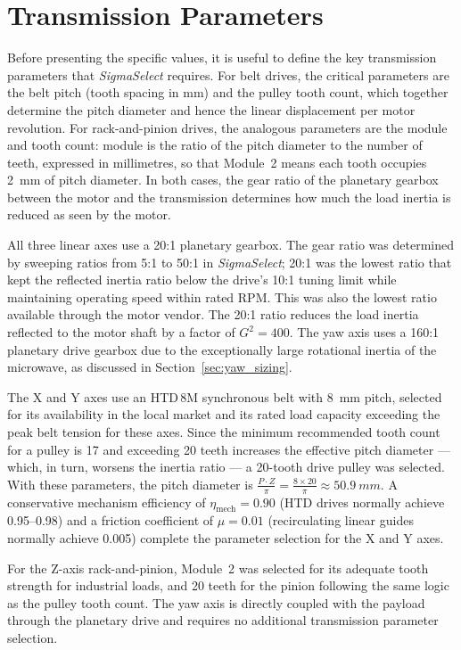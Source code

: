 \section{Transmission Parameters}

Before presenting the specific values, it is useful to define the key transmission parameters that \textit{SigmaSelect} requires. For belt drives, the critical parameters are the belt pitch (tooth spacing in mm) and the pulley tooth count, which together determine the pitch diameter and hence the linear displacement per motor revolution. For rack-and-pinion drives, the analogous parameters are the module and tooth count: module is the ratio of the pitch diameter to the number of teeth, expressed in millimetres, so that Module~2 means each tooth occupies \SI{2}{mm} of pitch diameter. In both cases, the gear ratio of the planetary gearbox between the motor and the transmission determines how much the load inertia is reduced as seen by the motor.

All three linear axes use a 20:1 planetary gearbox. The gear ratio was determined by sweeping ratios from 5:1 to 50:1 in \textit{SigmaSelect}; 20:1 was the lowest ratio that kept the reflected inertia ratio below the drive's 10:1 tuning limit while maintaining operating speed within rated RPM. This was also the lowest ratio available through the motor vendor. The 20:1 ratio reduces the load inertia reflected to the motor shaft by a factor of $G^2 = 400$. The yaw axis uses a 160:1 planetary drive gearbox due to the exceptionally large rotational inertia of the microwave, as discussed in Section~\ref{sec:yaw_sizing}.

The X and Y axes use an HTD\,8M synchronous belt with \SI{8}{mm} pitch, selected for its availability in the local market and its rated load capacity exceeding the peak belt tension for these axes. Since the minimum recommended tooth count for a pulley is 17 and exceeding 20 teeth increases the effective pitch diameter --- which, in turn, worsens the inertia ratio --- a 20-tooth drive pulley was selected. With these parameters, the pitch diameter is $\frac{P \cdot Z}{\pi} = \frac{8 \times 20}{\pi} \approx \SI{50.9}{mm}$. A conservative mechanism efficiency of $\eta_\text{mech} = 0.90$ (HTD drives normally achieve 0.95--0.98) and a friction coefficient of $\mu = 0.01$ (recirculating linear guides normally achieve 0.005) complete the parameter selection for the X and Y axes.

For the Z-axis rack-and-pinion, Module~2 was selected for its adequate tooth strength for industrial loads, and 20 teeth for the pinion following the same logic as the pulley tooth count. The yaw axis is directly coupled with the payload through the planetary drive and requires no additional transmission parameter selection.

